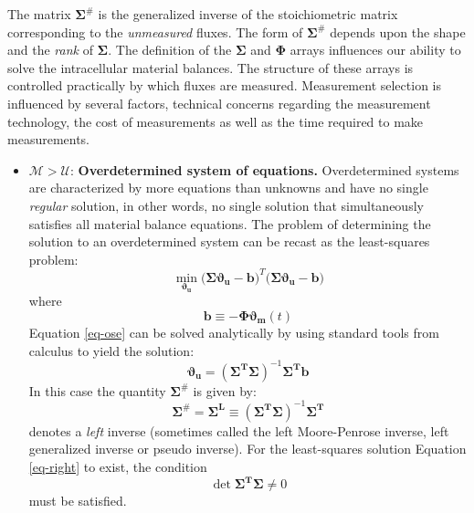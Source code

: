 \documentclass[11pt]{article}
\theoremstyle{definition}
\begin{document}
The matrix $\mathbf{\Sigma}^{\#}$ is the generalized inverse of the stoichiometric matrix corresponding to the \emph{unmeasured} fluxes.
The form of $\mathbf{\Sigma}^{\#}$ depends upon the shape and the \emph{rank} of $\mathbf{\Sigma}$.
The definition of the $\mathbf{\Sigma}$ and $\mathbf{\Phi}$ arrays influences our ability to solve the intracellular material balances. The structure of these arrays
is controlled practically by which fluxes are measured. Measurement selection is influenced by several factors, technical concerns regarding the measurement
technology, the cost of measurements as well as the time required to make measurements.

\begin{itemize}

\item{$\mathcal{M}>\mathcal{U}$: \textbf{Overdetermined system of equations.}
Overdetermined systems are characterized by more equations than unknowns and have no single \emph{regular} solution, in other
words, no single solution that simultaneously satisfies all material balance equations.
The problem of determining the solution to an overdetermined system can be recast as the least-squares problem:
\begin{equation}\label{eq-ose}
\min_{\mathbf{\vartheta_{u}}}\bigl(\mathbf{\Sigma\vartheta_{u}}-\mathbf{b}\bigr)^{T}\bigl(\mathbf{\Sigma\vartheta_{u}}-\mathbf{b}\bigr)
\end{equation}where
\begin{equation}
\mathbf{b}\equiv-\mathbf{\Phi\vartheta_{m}}\left(t\right)
\end{equation}
Equation \eqref{eq-ose} can be solved analytically by using standard tools from calculus to yield the solution:
\begin{equation}\label{eq-right}
\mathbf{\vartheta_{u}}=\left(\mathbf{\Sigma^{T}\Sigma}\right)^{-1}\mathbf{\Sigma^{T}b}
\end{equation}In this case the quantity $\mathbf{\Sigma}^{\#}$ is given by:
\begin{equation}
\mathbf{\Sigma}^{\#} = \mathbf{\Sigma^{L}}\equiv\left(\mathbf{\Sigma^{T}\Sigma}\right)^{-1}\mathbf{\Sigma^{T}}
\end{equation}denotes a \emph{left} inverse (sometimes called the left Moore-Penrose inverse, left generalized inverse or pseudo inverse).
For the least-squares solution Equation
\eqref{eq-right} to exist, the condition
\begin{equation}
\det\mathbf{\Sigma^{T}\Sigma}\neq{0}
\end{equation}must be satisfied.}


\end{itemize}
\end{document}
